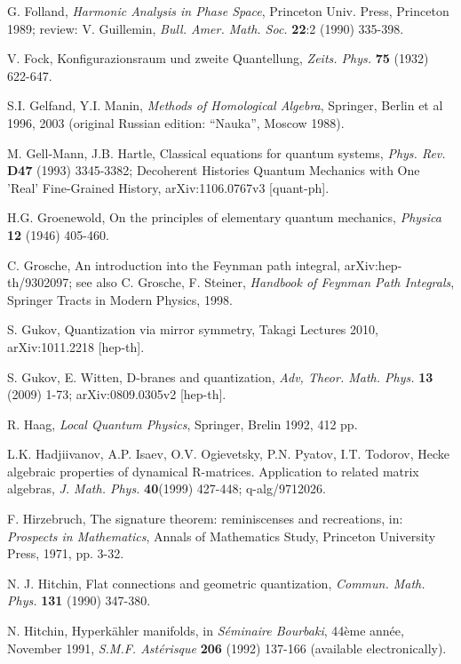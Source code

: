 \documentclass[12pt]{article}
\begin{document}
\begin{thebibliography}{000}
 G. Folland, {\it Harmonic Analysis in Phase Space}, Princeton Univ. Press, Princeton 1989;
review: V. Guillemin, {\it Bull. Amer. Math. Soc.} {\bf 22}:2 (1990) 335-398.

 V. Fock, Konfigurazionsraum und zweite Quantellung, {\it
Zeits. Phys.} {\bf 75} (1932) 622-647.

 S.I. Gelfand, Y.I. Manin, {\it Methods of Homological Algebra}, Springer,
Berlin et al 1996, 2003 (original Russian edition: ``Nauka'', Moscow 1988).

 M. Gell-Mann, J.B. Hartle, Classical equations for quantum systems, {\it Phys. Rev.} 
{\bf D47} (1993) 3345-3382; Decoherent Histories Quantum Mechanics with One 'Real' Fine-Grained History,
 arXiv:1106.0767v3 [quant-ph].

 H.G. Groenewold, On the principles of elementary quantum mechanics,
{\it Physica} {\bf 12} (1946) 405-460.

 C. Grosche, An introduction into the Feynman path integral, arXiv:hep-th/9302097;
see also C. Grosche, F. Steiner, {\it Handbook of Feynman Path Integrals}, Springer Tracts in Modern Physics, 1998.

 S. Gukov, Quantization via mirror symmetry, Takagi
Lectures 2010, arXiv:1011.2218 [hep-th].

 S. Gukov, E. Witten, D-branes and quantization, {\it
Adv, Theor. Math. Phys.} {\bf 13} (2009) 1-73; arXiv:0809.0305v2 [hep-th].

 R. Haag, {\it Local Quantum Physics}, Springer, Brelin 1992,
412 pp.

 L.K. Hadjiivanov, A.P. Isaev, O.V. Ogievetsky, P.N.
Pyatov, I.T. Todorov, Hecke algebraic properties of dynamical R-matrices. 
Application to related matrix algebras, {\it J. Math. Phys.} {\bf 40}(1999) 
427-448; q-alg/9712026.

 F. Hirzebruch, The signature theorem: reminiscenses and
recreations, in: {\it Prospects in Mathematics}, Annals of Mathematics Study,
Princeton University Press, 1971, pp. 3-32.

 N. J. Hitchin, Flat connections and geometric quantization,
{\it Commun. Math. Phys.} {\bf 131} (1990) 347-380.

 N. Hitchin, Hyperk\"ahler manifolds, in {\it S\'eminaire
Bourbaki}, 44\`eme ann\'ee, November 1991, {\it S.M.F. Ast\'erisque} {\bf 206}
(1992) 137-166 (available electronically).
 

\end{thebibliography}
\end{document}
